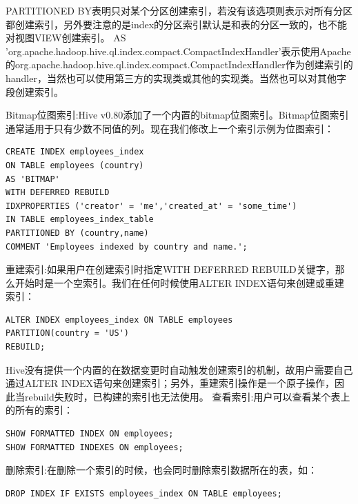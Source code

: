 \par PARTITIONED BY表明只对某个分区创建索引，若没有该选项则表示对所有分区都创建索引，另外要注意的是index的分区索引默认是和表的分区一致的，也不能对视图VIEW创建索引。
AS 'org.apache.hadoop.hive.ql.index.compact.CompactIndexHandler'表示使用Apache的org.apache.hadoop.hive.ql.index.compact.CompactIndexHandler作为创建索引的handler，当然也可以使用第三方的实现类或其他的实现类。当然也可以对其他字段创建索引。 
\par Bitmap位图索引:Hive v0.80添加了一个内置的bitmap位图索引。Bitmap位图索引通常适用于只有少数不同值的列。现在我们修改上一个索引示例为位图索引：
\begin{verbatim}
CREATE INDEX employees_index
ON TABLE employees (country)
AS 'BITMAP'
WITH DEFERRED REBUILD
IDXPROPERTIES ('creator' = 'me','created_at' = 'some_time')
IN TABLE employees_index_table
PARTITIONED BY (country,name)
COMMENT 'Employees indexed by country and name.';
\end{verbatim}
重建索引:如果用户在创建索引时指定WITH DEFERRED REBUILD关键字，那么开始时是一个空索引。我们在任何时候使用ALTER INDEX语句来创建或重建索引：
\begin{verbatim}
ALTER INDEX employees_index ON TABLE employees 
PARTITION(country = 'US')
REBUILD;
\end{verbatim}
\par Hive没有提供一个内置的在数据变更时自动触发创建索引的机制，故用户需要自己通过ALTER INDEX语句来创建索引；另外，重建索引操作是一个原子操作，因此当rebuild失败时，已构建的索引也无法使用。
查看索引:用户可以查看某个表上的所有的索引：
\begin{verbatim}
SHOW FORMATTED INDEX ON employees;
SHOW FORMATTED INDEXES ON employees;
\end{verbatim}
删除索引:在删除一个索引的时候，也会同时删除索引数据所在的表，如：
\begin{verbatim}
DROP INDEX IF EXISTS employees_index ON TABLE employees;
\end{verbatim}





